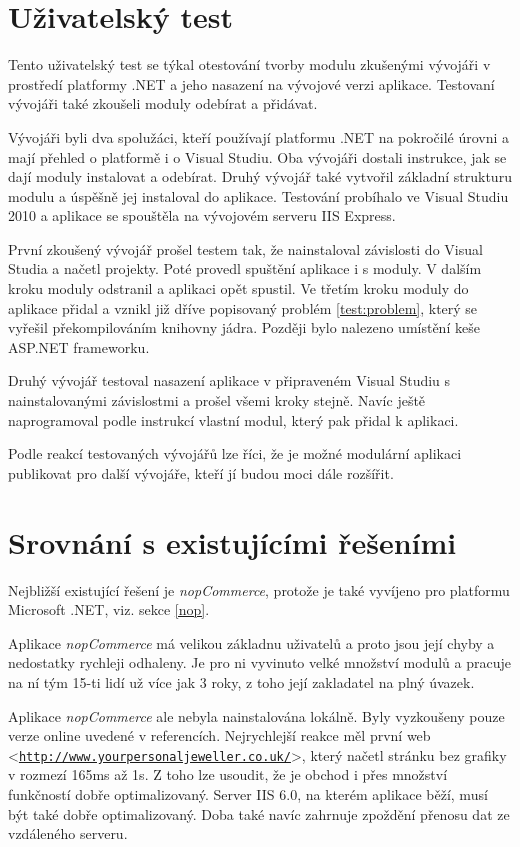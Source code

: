 \documentclass[11pt,twoside,a4paper]{book}
\let\oldUrl\url
\renewcommand\url[1]{<\texttt{\oldUrl{#1}}>}
\begin{document}
\section{Uživatelský test}
Tento uživatelský test se týkal otestování tvorby modulu zkušenými vývojáři v prostředí platformy .NET a jeho nasazení na vývojové verzi aplikace. Testovaní vývojáři také zkoušeli moduly odebírat a přidávat.

Vývojáři byli dva spolužáci, kteří používají platformu .NET na pokročilé úrovni a mají přehled o platformě i o Visual Studiu. Oba vývojáři dostali instrukce, jak se dají moduly instalovat a odebírat. Druhý vývojář také vytvořil základní strukturu modulu a úspěšně jej instaloval do aplikace. Testování probíhalo ve Visual Studiu 2010 a aplikace se spouštěla na vývojovém serveru IIS Express.

První zkoušený vývojář prošel testem tak, že nainstaloval závislosti do Visual Studia a načetl projekty. Poté provedl spuštění aplikace i s moduly. V dalším kroku moduly odstranil a aplikaci opět spustil. Ve třetím kroku moduly do aplikace přidal a vznikl již dříve popisovaný problém \ref{test:problem}, který se vyřešil překompilováním knihovny jádra. Později bylo nalezeno umístění keše ASP.NET frameworku.

Druhý vývojář testoval nasazení aplikace v připraveném Visual Studiu s nainstalovanými závislostmi a prošel všemi kroky stejně. Navíc ještě naprogramoval podle instrukcí vlastní modul, který pak přidal k aplikaci.

Podle reakcí testovaných vývojářů lze říci, že je možné modulární aplikaci publikovat pro další vývojáře, kteří jí budou moci dále rozšířit.


\section{Srovnání s existujícími řešeními}

Nejbližší existující řešení je \textit{nopCommerce}, protože je také vyvíjeno pro platformu Microsoft .NET, viz. sekce \ref{nop}. 

Aplikace \textit{nopCommerce} má velikou základnu uživatelů a proto jsou její chyby a nedostatky rychleji odhaleny. Je pro ni vyvinuto velké množství modulů a pracuje na ní tým 15-ti lidí už více jak 3 roky, z toho její zakladatel na plný úvazek.

Aplikace \textit{nopCommerce} ale nebyla nainstalována lokálně. Byly vyzkoušeny pouze verze online uvedené v referencích. Nejrychlejší reakce měl první web \\ \url{http://www.yourpersonaljeweller.co.uk/}, který načetl stránku bez grafiky v rozmezí 165ms až 1s. Z toho lze usoudit, že je obchod i přes množství funkčností dobře optimalizovaný. Server IIS 6.0, na kterém aplikace běží, musí být také dobře optimalizovaný. Doba také navíc zahrnuje zpoždění přenosu dat ze vzdáleného serveru.
\end{document}
